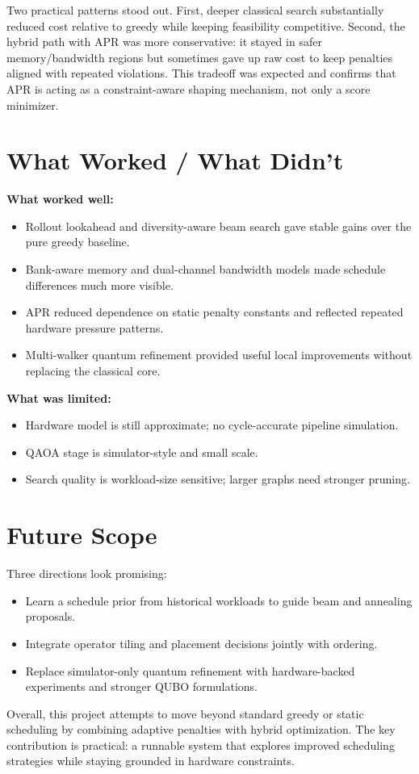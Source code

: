 \documentclass[11pt]{article}
\begin{document}
Two practical patterns stood out. First, deeper classical search substantially reduced cost relative to greedy while keeping feasibility competitive. Second, the hybrid path with APR was more conservative: it stayed in safer memory/bandwidth regions but sometimes gave up raw cost to keep penalties aligned with repeated violations. This tradeoff was expected and confirms that APR is acting as a constraint-aware shaping mechanism, not only a score minimizer.

\section{What Worked / What Didn't}
\textbf{What worked well:}
\begin{itemize}
    \item Rollout lookahead and diversity-aware beam search gave stable gains over the pure greedy baseline.
    \item Bank-aware memory and dual-channel bandwidth models made schedule differences much more visible.
    \item APR reduced dependence on static penalty constants and reflected repeated hardware pressure patterns.
    \item Multi-walker quantum refinement provided useful local improvements without replacing the classical core.
\end{itemize}

\textbf{What was limited:}
\begin{itemize}
    \item Hardware model is still approximate; no cycle-accurate pipeline simulation.
    \item QAOA stage is simulator-style and small scale.
    \item Search quality is workload-size sensitive; larger graphs need stronger pruning.
\end{itemize}

\section{Future Scope}
Three directions look promising:
\begin{itemize}
    \item Learn a schedule prior from historical workloads to guide beam and annealing proposals.
    \item Integrate operator tiling and placement decisions jointly with ordering.
    \item Replace simulator-only quantum refinement with hardware-backed experiments and stronger QUBO formulations.
\end{itemize}

Overall, this project attempts to move beyond standard greedy or static scheduling by combining adaptive penalties with hybrid optimization. The key contribution is practical: a runnable system that explores improved scheduling strategies while staying grounded in hardware constraints.
\end{document}
